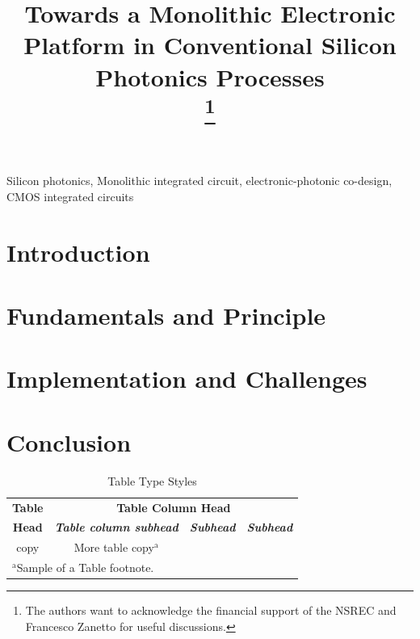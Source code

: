 \documentclass[conference]{IEEEtran}
\begin{document}
\title{Towards a Monolithic Electronic Platform in Conventional Silicon Photonics Processes\\
\thanks{The authors want to acknowledge the financial support of the NSREC and Francesco Zanetto for useful discussions.}
}
\author{
}

\newcommand{\CitationNeeded}{\textcolor{red}{\setlength{\fboxsep}{1pt}\colorbox{yellow}{[citation needed]}}}

\maketitle

\begin{abstract}

\end{abstract}

\begin{IEEEkeywords}
Silicon photonics, Monolithic integrated circuit, electronic-photonic co-design, CMOS integrated circuits
\end{IEEEkeywords}

\section{Introduction}




\section{Fundamentals and Principle}


\section{Implementation and Challenges}


\section{Conclusion}



\iffalse
\begin{table}[htbp]
\caption{Table Type Styles}
\begin{center}
\begin{tabular}{|c|c|c|c|}
\hline
\textbf{Table}&\multicolumn{3}{|c|}{\textbf{Table Column Head}} \\
\cline{2-4} 
\textbf{Head} & \textbf{\textit{Table column subhead}}& \textbf{\textit{Subhead}}& \textbf{\textit{Subhead}} \\
\hline
copy& More table copy$^{\mathrm{a}}$& &  \\
\hline
\multicolumn{4}{l}{$^{\mathrm{a}}$Sample of a Table footnote.}
\end{tabular}
\label{tab1}
\end{center}
\end{table}
\end{document}
